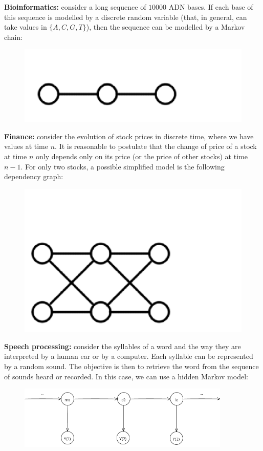 \documentclass[12pt]{report}	%
\begin{document}
\item \textbf{Bioinformatics:} consider a long sequence of $10000$ ADN bases. If each base of this sequence is modelled by a discrete random variable (that, in general, can take values in $\{A, C, G, T\}$), then the sequence can be modelled by a Markov chain:
\begin{figure}[ht]
\begin{center}
\includegraphics[angle=0, height=1.5 cm]{graphe_ADN.pdf}
\end{center}
\centering
\end{figure}

\item \textbf{Finance:} consider the evolution of stock prices in discrete time, where we have values at time $n$. It is reasonable to postulate that the change of price of a stock at time $n$ only depends only on its price (or the price of other stocks) at time $n-1$. For only two stocks, a possible simplified model is the following dependency graph:
\begin{figure}[ht]
\begin{center}
\includegraphics[angle=0, height=2.5 cm]{graphe_action.pdf}
\end{center}
\centering
\end{figure}

\item \textbf{Speech processing:} consider the syllables of a word and the way they are interpreted by a human ear or by a computer. Each syllable can be represented by a random sound. The objective is then to retrieve the word from the sequence of sounds heard or recorded. In this case, we can use a hidden Markov model:
\begin{figure}[ht]
\begin{center}
\includegraphics[angle=0, height=3cm]{graphe_parole.png}
\end{center}
\end{figure}
\end{document}
